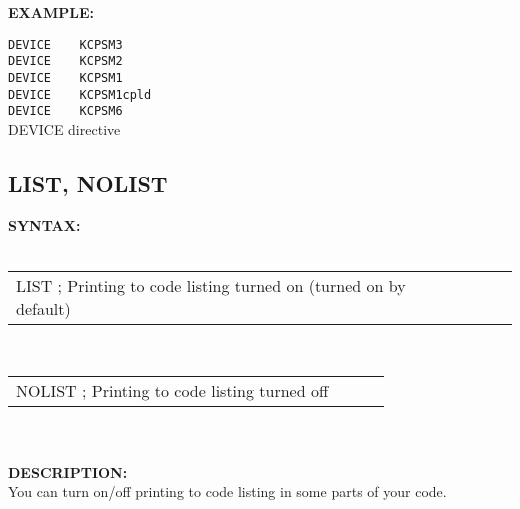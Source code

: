 {                \textbf{EXAMPLE:}\\
                        \begin{code}[h!]
                            {\color{highlight_directive}\verb'DEVICE'}\verb`    `{\color{highlight_symbol}\verb'KCPSM3'}\\
                            {\color{highlight_directive}\verb'DEVICE'}\verb`    `{\color{highlight_symbol}\verb'KCPSM2'}\\
                            {\color{highlight_directive}\verb'DEVICE'}\verb`    `{\color{highlight_symbol}\verb'KCPSM1'}\\
                            {\color{highlight_directive}\verb'DEVICE'}\verb`    `{\color{highlight_symbol}\verb'KCPSM1cpld'}\\
                            {\color{highlight_directive}\verb'DEVICE'}\verb`    `{\color{highlight_symbol}\verb'KCPSM6'}\\
                            \caption{DEVICE directive}
                        \end{code}

                \subsection{LIST, NOLIST}
                \textbf{SYNTAX:}\\
                \\ {
                    \texttt{}
                    \begin{tabular}[h!]{llll}
                            { \color{highlight_directive} LIST }
                            { \color{highlight_comment} ; Printing to code listing turned on (turned on by default)  }\\
                    \end{tabular}
                    }\\

                {
                    \texttt{}
                    \begin{tabular}[h!]{llll}
                            { \color{highlight_directive} NOLIST }
                            { \color{highlight_comment} ; Printing to code listing turned off  }\\
                    \end{tabular}
                    }\\
                    \\
                \textbf{DESCRIPTION:}\\
                You can turn on/off printing to code listing in some parts of your code.\\

}
